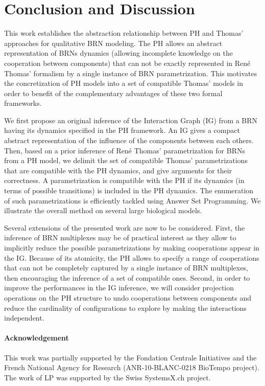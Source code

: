 \section{Conclusion and Discussion}


This work establishes the abstraction relationship between PH and Thomas' approaches for
qualitative BRN modeling.
The PH allows an abstract representation of BRNs dynamics (allowing incomplete knowledge on the
cooperation between components) that can not be exactly represented in Ren\'e Thomas' formalism by a
single instance of BRN parametrization.
This motivates the concretization of PH models into a set of compatible Thomas' models in order to benefit
of the complementary advantages of these two formal frameworks.

We first propose an original inference of the Interaction Graph (IG) from a BRN
having its dynamics specified in the PH framework.
An IG gives a compact abstract representation of the influence of the components between each
others.
Then, based on a prior inference of Ren\'e Thomas' parametrization for BRNs from a PH model, we
delimit the set of compatible Thomas' parametrizations that are compatible with the PH dynamics,
and give arguments for their correctness.
A parametrization is compatible with the PH if its dynamics (in terms of possible transitions) is included in the PH dynamics.
The enumeration of such parametrizations is efficiently tackled using Answer Set Programming.
We illustrate the overall method on several large biological models.

Several extensions of the presented work are now to be considered.
First, the inference of BRN multiplexes \cite{BernotMultiplexes} may be of practical interest 
as they allow to implicitly reduce the possible parametrizations by making cooperations appear
in the IG.
Because of its atomicity, the PH allows to specify a range of cooperations that can not be
completely captured by a single instance of BRN multiplexes, then encouraging the inference of a set
of compatible ones.
Second, in order to improve the performances in the IG inference, we will consider projection operations on
the PH structure to undo cooperations between components and reduce the cardinality of
configurations to explore by making the interactions independent.

\paragraph{Acknowledgement}
This work was partially supported by the Fondation Centrale Initiatives and
the French National Agency for Research (ANR-10-BLANC-0218 BioTempo project).
The work of LP was supported by the Swiss SystemsX.ch project.
